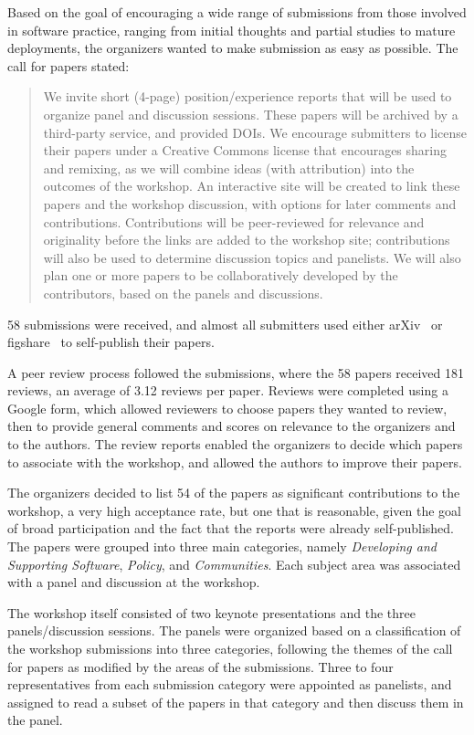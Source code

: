 \documentclass[11pt, oneside]{amsart}
\begin{document}
Based on the goal of encouraging a wide range of submissions from
those involved in software practice, ranging from initial thoughts and
partial studies to mature deployments, the organizers wanted to make
submission as easy as possible. The call for papers stated:

\begin{quote}
We invite short (4-page) position/experience reports that will be used
to organize panel and discussion sessions. These papers will be
archived by a third-party service, and provided DOIs. We encourage
submitters to license their papers under a Creative Commons license
that encourages sharing and remixing, as we will combine ideas (with
attribution) into the outcomes of the workshop.  An interactive site
will be created to link these papers and the workshop discussion, with
options for later comments and contributions. Contributions will be
peer-reviewed for relevance and originality before the links are added
to the workshop site; contributions will also be used to determine
discussion topics and panelists. We will also plan one or more papers
to be collaboratively developed by the contributors, based on the
panels and discussions.
\end{quote}

58 submissions were received, and almost all submitters used either
arXiv~\cite{arXiv-web} or figshare~\cite{figshare-web} to self-publish
their papers.

A peer review process followed the submissions, where
the 58 papers received 181 reviews, an average of 3.12 reviews per
paper. Reviews were completed using a Google form, which allowed
reviewers to choose papers they wanted to review, then to provide
general comments and scores on relevance to the organizers and
to the authors. The review reports enabled the organizers to decide
which papers to associate with the workshop, and allowed the authors
to improve their papers.

The organizers decided to list 54 of the papers as significant
contributions to the workshop, a very high acceptance rate, but one
that is reasonable, given the goal of broad participation and the fact
that the reports were already self-published. The papers were
grouped into three main categories, namely \emph{Developing and
Supporting Software}, \emph{Policy}, and \emph{Communities}. Each
subject area was associated with a panel and discussion at the
workshop.

The workshop itself consisted of two keynote presentations and the
three panels/discussion sessions. The panels were organized based on a
classification of the workshop submissions into three categories,
following the themes of the call for papers as modified by the areas
of the submissions. Three to four representatives from each submission
category were appointed as panelists, and assigned to read a subset of
the papers in that category and then discuss them in the panel.
\end{document}
